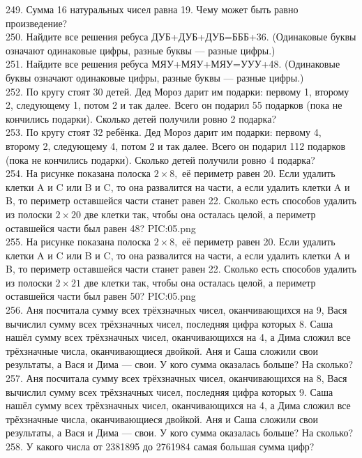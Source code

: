 249. Сумма 16 натуральных чисел равна 19. Чему может быть равно произведение?\\
250. Найдите все решения ребуса ДУБ+ДУБ+ДУБ=БББ+36. (Одинаковые буквы означают одинаковые цифры, разные буквы --- разные цифры.)\\
251. Найдите все решения ребуса МЯУ+МЯУ+МЯУ=УУУ+48. (Одинаковые буквы означают одинаковые цифры, разные буквы --- разные цифры.)\\
252. По кругу стоят 30 детей. Дед Мороз дарит им подарки: первому 1, второму 2, следующему 1, потом 2 и так далее. Всего он подарил 55 подарков (пока не кончились подарки). Сколько детей получили ровно 2 подарка?\\
253. По кругу стоят 32 ребёнка. Дед Мороз дарит им подарки: первому 4, второму 2, следующему 4, потом 2 и так далее. Всего он подарил 112 подарков (пока не кончились подарки). Сколько детей получили ровно 4 подарка?\\
254. На рисунке показана полоска $2\times 8,$ её периметр равен 20. Если удалить клетки A и C или B и C, то она развалится на части, а если удалить клетки A и B, то периметр оставшейся части станет равен 22. Сколько есть способов удалить из полоски $2\times 20$ две клетки так, чтобы она осталась целой, а периметр оставшейся части был равен 48?
{{PIC:05.png}}\\
255. На рисунке показана полоска $2\times 8,$ её периметр равен 20. Если удалить клетки A и C или B и C, то она развалится на части, а если удалить клетки A и B, то периметр оставшейся части станет равен 22. Сколько есть способов удалить из полоски $2\times 21$ две клетки так, чтобы она осталась целой, а периметр оставшейся части был равен 50?
{{PIC:05.png}}\\
256. Аня посчитала сумму всех трёхзначных чисел, оканчивающихся на 9, Вася вычислил сумму всех трёхзначных чисел, последняя цифра которых 8. Саша нашёл сумму всех трёхзначных чисел, оканчивающихся на 4, а Дима сложил все трёхзначные числа, оканчивающиеся двойкой. Аня и Саша сложили свои результаты, а Вася и Дима --- свои. У кого сумма оказалась больше? На сколько?\\
257. Аня посчитала сумму всех трёхзначных чисел, оканчивающихся на 8, Вася вычислил сумму всех трёхзначных чисел, последняя цифра которых 9. Саша нашёл сумму всех трёхзначных чисел, оканчивающихся на 4, а Дима сложил все трёхзначные числа, оканчивающиеся двойкой. Аня и Саша сложили свои результаты, а Вася и Дима --- свои. У кого сумма оказалась больше? На сколько?\\
258. У какого числа от 2381895 до 2761984 самая большая сумма цифр?\\
